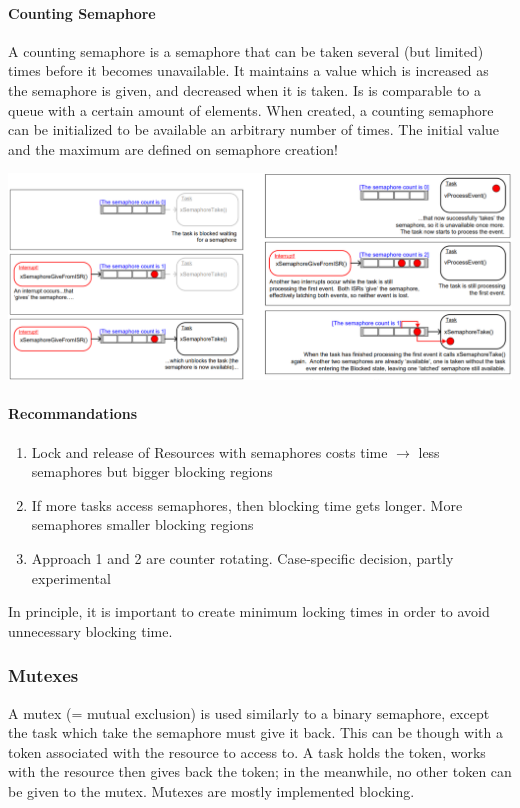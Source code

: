 \paragraph{Counting Semaphore}
A counting semaphore is a semaphore that can be taken several (but limited) times before it becomes unavailable.
It maintains a value which is increased as the semaphore is given, and decreased when it is taken.
Is is comparable to a queue with a certain amount of elements.
When created, a counting semaphore can be initialized to be available an arbitrary number of times.
The initial value and the maximum are defined on semaphore creation!

\includegraphics[width=\textwidth]{images/Concurrency/counting_semaphore.png}

\paragraph{Recommandations}
\begin{enumerate}
	\item Lock and release of Resources with semaphores costs time $\rightarrow$ less semaphores but bigger blocking regions
	\item If more tasks access semaphores, then blocking time gets longer.
	      More semaphores smaller blocking regions
	\item Approach 1 and 2 are counter rotating.
	      Case-specific decision, partly experimental
\end{enumerate}
In principle, it is important to create minimum locking times in order to avoid unnecessary blocking time.

\subsubsection{Mutexes}
A mutex (= mutual exclusion) is used similarly to a binary semaphore, except the task which take the semaphore must give it back.
This can be though with a token associated with the resource to access to.
A task holds the token, works with the resource then gives back the token; in the meanwhile, no other token can be given to the mutex.
Mutexes are mostly implemented blocking.


